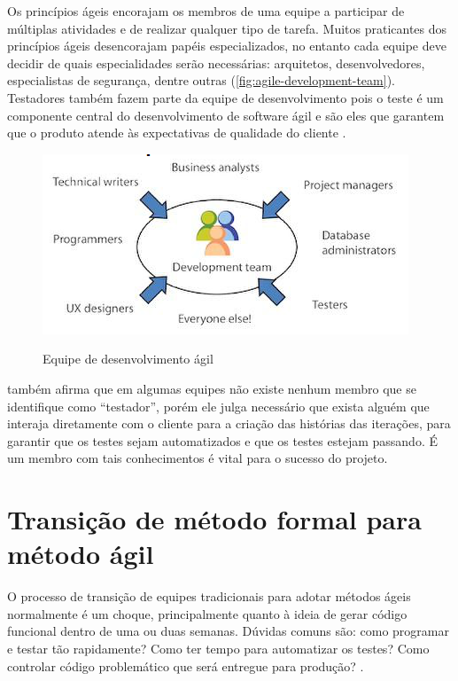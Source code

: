 \documentclass[
	12pt,				%
	openright,			%
	oneside,			%
	a4paper,			%
	english,			%
	brazil,				%
	]{abntex2}
\begin{document}
Os princípios ágeis encorajam os membros de uma equipe a participar de múltiplas atividades e de realizar qualquer tipo de tarefa. Muitos praticantes dos princípios ágeis desencorajam papéis especializados, no entanto cada equipe deve decidir de quais especialidades serão necessárias: arquitetos, desenvolvedores, especialistas de segurança, dentre outras (\autoref{fig:agile-development-team}). Testadores também fazem parte da equipe de desenvolvimento pois o teste é um componente central do desenvolvimento de software ágil e são eles que garantem que o produto atende às expectativas de qualidade do cliente \cite{crispin2009}.

\begin{figure}[H]
    \centering
    \caption{Equipe de desenvolvimento ágil}
    \graphicspath{ {./graphics/agile/} }
    \includegraphics[scale=1.0]{agile-development-team}
    \label{fig:agile-development-team}
\end{figure}

 também afirma que em algumas equipes não existe nenhum membro que se identifique como ``testador'', porém ele julga necessário que exista alguém que interaja diretamente com o cliente para a criação das histórias das iterações, para garantir que os testes sejam automatizados e que os testes estejam passando. É um membro com tais conhecimentos é vital para o sucesso do projeto.

\section{Transição de método formal para método ágil}

O processo de transição de equipes tradicionais para adotar métodos ágeis normalmente é um choque, principalmente quanto à ideia de gerar código funcional dentro de uma ou duas semanas. Dúvidas comuns são: como programar e testar tão rapidamente? Como ter tempo para automatizar os testes? Como controlar código problemático que será entregue para produção? \cite{crispin2009}.
\end{document}
